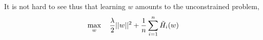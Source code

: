 It is not hard to see thus that learning $w$ amounts to the unconstrained problem,
\begin{equation}
  \max_{w} \quad\frac{\lambda}{2}||w||^{2}+ \frac{1}{n}\sum_{i=1}^{n}\Tilde{H}_{i}(w)
  \label{eq:svm-non-smooth}
\end{equation}

